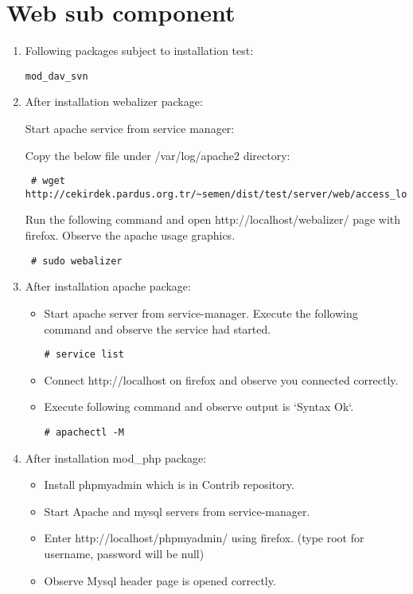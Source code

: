 \documentclass[a4paper,10pt]{article}
\begin{document}
\section{Web sub component}
\begin{enumerate}
\item Following packages subject to installation test:
\begin{verbatim}
mod_dav_svn 
\end{verbatim}

\item After installation webalizer package:

Start apache service from service manager:

Copy the below file under /var/log/apache2 directory:
\begin{verbatim}
 # wget http://cekirdek.pardus.org.tr/~semen/dist/test/server/web/access_log
\end{verbatim}

Run the following command and open http://localhost/webalizer/ page with firefox. Observe the apache usage graphics.
\begin{verbatim}
 # sudo webalizer
\end{verbatim}

\item After installation apache package:
\begin{itemize}
\item Start apache server from service-manager. Execute the following command and observe the service had started.
\begin{verbatim}
# service list
\end{verbatim}
\item Connect http://localhost on firefox and observe you connected correctly.
\item Execute following command and observe output is `Syntax Ok`.
\begin{verbatim}
# apachectl -M 
\end{verbatim}

\end{itemize}

\item After installation mod\_php package:

\begin{itemize}
 \item Install phpmyadmin which is in Contrib repository.
 \item Start Apache and mysql servers from service-manager.
 \item Enter http://localhost/phpmyadmin/ using firefox. (type root for username, password will be null)
 \item Observe Mysql header page is opened correctly.
\end{itemize}


\end{enumerate}
\end{document}
